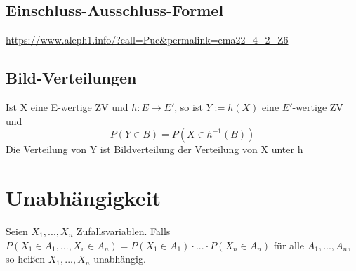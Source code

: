 \documentclass{article}
\begin{document}
\subsection{Einschluss-Ausschluss-Formel}
\url{https://www.aleph1.info/?call=Puc&permalink=ema22_4_2_Z6}

\subsection{Bild-Verteilungen}
Ist X eine E-wertige ZV und $h : E → E'$, so ist $Y := h(X)$ eine $E'$-wertige ZV und
 \[P(Y \in B) = P(X \in h^{-1}(B))\]
Die Verteilung von Y ist Bildverteilung der Verteilung von X unter h

\section{Unabhängigkeit}
Seien $X_1, ..., X_n$ Zufallsvariablen. Falls $P(X_1 \in A_1, ..., X_v \in A_n) = P(X_1 \in A_1) \cdot ... \cdot P(X_n \in A_n)$ für alle $A_1, ..., A_n$, so heißen $X_1, ..., X_n$ unabhängig.
\end{document}
